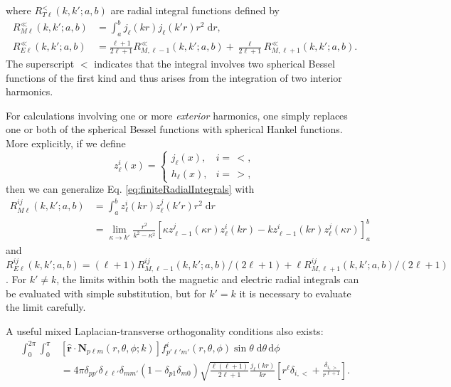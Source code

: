 \documentclass{article}
\begin{document}
where $R_{T\ell}^<(k,k';a,b)$ are radial integral functions defined by
\begin{equation}\label{eq:finiteRadialIntegrals}
\begin{split}
R_{M\ell}^\ll(k,k';a,b) &= \int_a^bj_\ell(kr)j_\ell(k'r)r^2\;\mathrm{d}r,\\
R_{E\ell}^\ll(k,k';a,b) &= \frac{\ell + 1}{2\ell + 1}R_{M,\ell-1}^\ll(k,k';a,b) + \frac{\ell}{2\ell + 1}R_{M,\ell + 1}^\ll(k,k';a,b).
\end{split}
\end{equation}
The superscript $<$ indicates that the integral involves two spherical Bessel functions of the first kind and thus arises from the integration of two interior harmonics. 

For calculations involving one or more \textit{exterior} harmonics, one simply replaces one or both of the spherical Bessel functions with spherical Hankel functions. More explicitly, if we define 
\begin{equation}
z_\ell^i(x) = 
\begin{cases}
j_\ell(x), & i = \,<,\\
h_\ell(x), & i = \,>,
\end{cases}
\end{equation}
then we can generalize Eq. \eqref{eq:finiteRadialIntegrals} with
\begin{equation}
\begin{split}
R_{M\ell}^{ij}(k,k';a,b) &= \int_a^bz_\ell^i(kr)z_\ell^j(k'r)r^2\;\mathrm{d}r\\
&= \lim_{\kappa\to k'}\frac{r^2}{k^2 - \kappa^2}\left[\kappa z_{\ell-1}^j(\kappa r)z_{\ell}^i(kr) - kz_{\ell-1}^i(kr)z_{\ell}^j(\kappa r)\right]_a^b
\end{split}
\end{equation}
and $R_{E\ell}^{ij}(k,k';a,b) = (\ell+1)R_{M,\ell - 1}^{ij}(k,k';a,b)/(2\ell + 1) + \ell R_{M,\ell + 1}^{ij}(k,k';a,b)/(2\ell + 1)$. For $k'\neq k$, the limits within both the magnetic and electric radial integrals can be evaluated with simple substitution, but for $k'=k$ it is necessary to evaluate the limit carefully.

A useful mixed Laplacian-transverse orthogonality conditions also exists:
\begin{equation}\label{eq:angularMixedOrthogonality}
\begin{split}
\int_0^{2\pi}\int_0^\pi&\left[\hat{\mathbf{r}}\cdot\mathbf{N}_{p\ell m}(r,\theta,\phi;k)\right]f_{p'\ell'm'}^i(r,\theta,\phi)\sin\theta\;\mathrm{d}\theta\,\mathrm{d}\phi\\
&= 4\pi\delta_{pp'}\delta_{\ell\ell'}\delta_{mm'}(1 - \delta_{p1}\delta_{m0})\sqrt{\frac{\ell(\ell + 1)}{2\ell + 1}}\frac{j_\ell(kr)}{kr}\left[r^\ell\delta_{i,<} + \frac{\delta_{i,>}}{r^{\ell + 1}}\right].
\end{split}
\end{equation}
\end{document}
